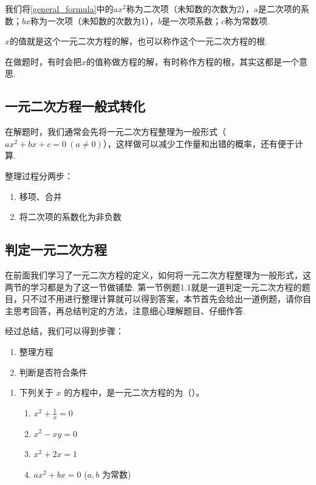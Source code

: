 \documentclass[lang=cn, 10pt, titlestyle=hang]{elegantbook}
\begin{document}
\vspace{10pt}

我们将\eqref{general_formula}中的$ax^2$称为二次项（未知数的次数为2），a是二次项的系数；$bx$称为一次项（未知数的次数为1），$b$是一次项系数；$c$称为常数项.
\par
$x$的值就是这个一元二次方程的解，也可以称作这个一元二次方程的根.
\begin{remark}
    在做题时，有时会把$x$的值称做方程的解，有时称作方程的根，其实这都是一个意思.
\end{remark}





\subsection{一元二次方程一般式转化}

在解题时，我们通常会先将一元二次方程整理为一般形式（$
ax^2 + bx + c = 0 \ (a \neq 0)
$），这样做可以减少工作量和出错的概率，还有便于计算.



整理过程分两步：
\begin{enumerate}
    \item 移项、合并
    \item 将二次项的系数化为非负数
\end{enumerate}

\subsection{判定一元二次方程}
在前面我们学习了一元二次方程的定义，如何将一元二次方程整理为一般形式，这两节的学习都是为了这一节做铺垫. 第一节例题1.1就是一道判定一元二次方程的题目，只不过不用进行整理计算就可以得到答案，本节首先会给出一道例题，请你自主思考回答，再总结判定的方法，注意细心理解题目、仔细作答.



经过总结，我们可以得到步骤：



\begin{enumerate}
    \item 整理方程
    \item 判断是否符合条件
\end{enumerate}


\begin{exercise}
    \begin{enumerate}
        \item 下列关于 \( x \) 的方程中，是一元二次方程的为（{\hspace{3em}}）。
        \begin{enumerate}[label=\Alph*.]
            \item \( x^2 + \frac{1}{x} = 0 \)
            \item \( x^2 - xy = 0 \)
            \item \( x^2 + 2x = 1 \)
            \item \( ax^2 + bx = 0 \) (\( a, b \) 为常数)
        \end{enumerate}
    \end{enumerate}
\end{exercise}
\end{document}
